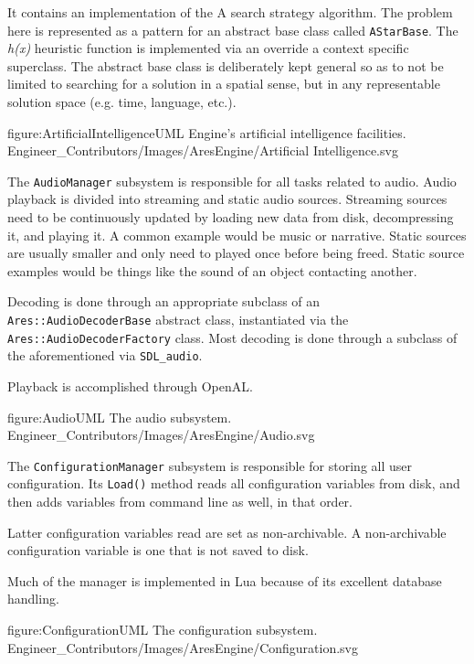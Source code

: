 It contains an implementation of the A\high{*} search strategy algorithm. The problem here is represented as a pattern for an abstract base class called {\tt AStarBase}. The {\it h(x)} heuristic function is implemented via an override a context specific superclass. The abstract base class is deliberately kept general so as to not be limited to searching for a solution in a spatial sense, but in any representable solution space (e.g. time, language, etc.).

\FullPageDiagram
    {figure:ArtificialIntelligenceUML}
    {Engine's artificial intelligence facilities.}
    {Engineer_Contributors/Images/AresEngine/Artificial Intelligence.svg}

\page
{}
The {\tt AudioManager} subsystem is responsible for all tasks related to audio. Audio playback is divided into streaming and static audio sources. Streaming sources need to be continuously updated by loading new data from disk, decompressing it, and playing it. A common example would be music or narrative. Static sources are usually smaller and only need to played once before being freed. Static source examples would be things like the sound of an object contacting another.

Decoding is done through an appropriate subclass of an {\tt Ares::AudioDecoderBase} abstract class, instantiated via the {\tt Ares::AudioDecoderFactory} class. Most decoding is done through a subclass of the aforementioned via {\tt SDL_audio}.

Playback is accomplished through OpenAL.

\FullPageDiagram
    {figure:AudioUML}
    {The audio subsystem.}
    {Engineer_Contributors/Images/AresEngine/Audio.svg}

\page
{}
The {\tt ConfigurationManager} subsystem is responsible for storing all user configuration. Its {\tt Load()} method reads all configuration variables from disk, and then adds variables from command line as well, in that order. 

Latter configuration variables read are set as non-archivable. A non-archivable configuration variable is one that is not saved to disk.

Much of the manager is implemented in Lua because of its excellent database handling.

\FullPageDiagram
    {figure:ConfigurationUML}
    {The configuration subsystem.}
    {Engineer_Contributors/Images/AresEngine/Configuration.svg}

